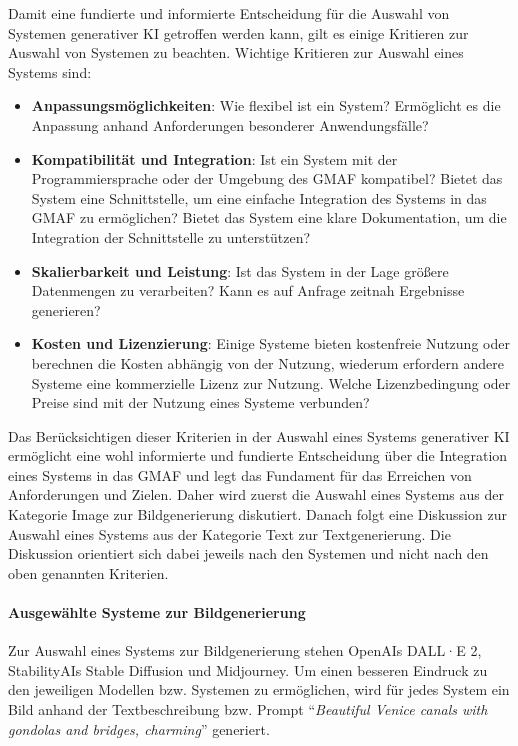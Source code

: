 Damit eine fundierte und informierte Entscheidung für die Auswahl von Systemen generativer KI getroffen werden kann, gilt es einige Kritieren zur Auswahl von Systemen zu beachten.
Wichtige Kritieren zur Auswahl eines Systems sind:
\begin{itemize}
    \item \textbf{Anpassungsmöglichkeiten}: Wie flexibel ist ein System?
    Ermöglicht es die Anpassung anhand Anforderungen besonderer Anwendungsfälle?
    \item \textbf{Kompatibilität und Integration}: Ist ein System mit der Programmiersprache oder der Umgebung des GMAF kompatibel?
    Bietet das System eine Schnittstelle, um eine einfache Integration des Systems in das GMAF zu ermöglichen?
    Bietet das System eine klare Dokumentation, um die Integration der Schnittstelle zu unterstützen?
    \item \textbf{Skalierbarkeit und Leistung}: Ist das System in der Lage größere Datenmengen zu verarbeiten?
    Kann es auf Anfrage zeitnah Ergebnisse generieren?
    \item \textbf{Kosten und Lizenzierung}: Einige Systeme bieten kostenfreie Nutzung oder berechnen die Kosten abhängig von der Nutzung, wiederum erfordern andere Systeme eine kommerzielle Lizenz zur Nutzung.
    Welche Lizenzbedingung oder Preise sind mit der Nutzung eines Systeme verbunden?
\end{itemize}

Das Berücksichtigen dieser Kriterien in der Auswahl eines Systems generativer KI ermöglicht eine wohl informierte und fundierte Entscheidung über die Integration eines Systems in das GMAF und legt das Fundament für das Erreichen von Anforderungen und Zielen.
Daher wird zuerst die Auswahl eines Systems aus der Kategorie Image zur Bildgenerierung diskutiert.
Danach folgt eine Diskussion zur Auswahl eines Systems aus der Kategorie Text zur Textgenerierung.
Die Diskussion orientiert sich dabei jeweils nach den Systemen und nicht nach den oben genannten Kriterien.

\paragraph{Ausgewählte Systeme zur Bildgenerierung}
Zur Auswahl eines Systems zur Bildgenerierung stehen OpenAIs DALL·E 2, StabilityAIs Stable Diffusion und Midjourney.
Um einen besseren Eindruck zu den jeweiligen Modellen bzw. Systemen zu ermöglichen, wird für jedes System ein Bild anhand der Textbeschreibung bzw. Prompt \enquote{\textit{Beautiful Venice canals with gondolas and bridges, charming}} generiert.

